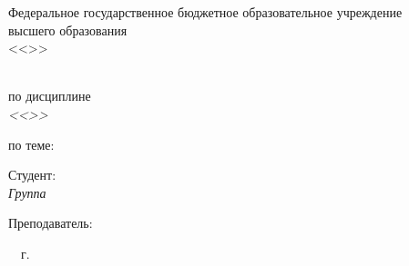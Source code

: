 \thispagestyle{empty}
\begin{center}
  \textbf{\cfgMinistry}

  \vspace{14pt}

  Федеральное государственное бюджетное образовательное учреждение\\
  высшего образования\\
  <<\cfgUniversity>>

  \vspace{14pt}

  \cfgDepartment
\end{center}

\vfill

\begin{center}
  \textbf{\cfgReportType}\\
  по дисциплине\\
  \textit{<<\cfgDiscipline>>}

  \vspace{14pt}

  по теме:\\
  {\large\textbf{\cfgTopic}}
\end{center}

\vfill

\noindent Студент:\\
\textit{Группа \textnumero~\cfgGroup \hfill \cfgStudentShort}

\vspace{14pt}

\noindent Преподаватель:\\
\textit{\cfgTeacherRank \hfill \cfgTeacherShort}

\vfill

\begin{center}
  \cfgCity~\cfgYear~г.
\end{center}
\newpage
